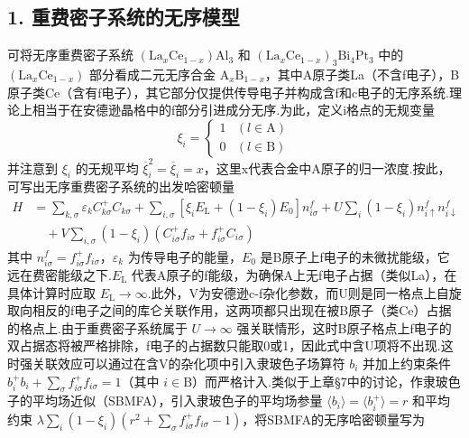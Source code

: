 \subsection*{1. 重费密子系统的无序模型}

可将无序重费密子系统 $\left(\mathrm{La}_{x}\mathrm{Ce}_{1-x}\right)\mathrm{Al}_{3}$ 和 $\left(\mathrm{La}_{x}\mathrm{Ce}_{1-x}\right)_{3}\mathrm{Bi}_{4}\mathrm{Pt}_{3}$ 中的 $\left(\mathrm{La}_{x}\mathrm{Ce}_{1-x}\right)$ 部分看成二元无序合金 $\mathrm{A}_{x}\mathrm{B}_{1-x}$，其中A原子类La（不含f电子），B原子类Ce（含有f电子），其它部分仅提供传导电子并构成含f和c电子的无序系统.理论上相当于在安德逊晶格中的f部分引进成分无序.为此，定义i格点的无规变量
\begin{equation}
  \xi_{i}=\begin{cases}1 & \left(l\in\mathrm{A}\right)\\ 0 & \left(l\in\mathrm{B}\right)\end{cases}
\end{equation}
并注意到 $\xi_{i}$ 的无规平均 $\overline{\xi}_{i}^{2}=\overline{\xi}_{i}=x$，这里x代表合金中A原子的归一浓度.按此，可写出无序重费密子系统的出发哈密顿量
\begin{equation}
\begin{aligned}
  H&=\sum_{k,\sigma}\varepsilon_{k}C_{k\sigma}^{+}C_{k\sigma}
  +\sum_{i,\sigma}\left[\xi_{i}E_{\mathrm{L}}+\left(1-\xi_{i}\right)E_{0}\right]n_{i\sigma}^{f}
  +U\sum_{i}\left(1-\xi_{i}\right)n_{i\uparrow}^{f}n_{i\downarrow}^{f}\\
  &\quad+V\sum_{i,\sigma}\left(1-\xi_{i}\right)
  \left(C_{i\sigma}^{+}f_{i\sigma}+f_{i\sigma}^{+}C_{i\sigma}\right)
\end{aligned}
\end{equation}
其中 $n_{i\sigma}^{f}=f_{i\sigma}^{+}f_{i\sigma}$，$\varepsilon_{k}$ 为传导电子的能量，$E_{0}$ 是B原子上f电子的未微扰能级，它远在费密能级之下.$E_{\mathrm{L}}$ 代表A原子的f能级，为确保A上无f电子占据（类似La），在具体计算时应取 $E_{\mathrm{L}}\rightarrow\infty$.此外，V为安德逊c-f杂化参数，而U则是同一格点上自旋取向相反的f电子之间的库仑关联作用，这两项都只出现在被B原子（类Ce）占据的格点上.由于重费密子系统属于 $U\rightarrow\infty$ 强关联情形，这时B原子格点上f电子的双占据态将被严格排除，f电子的占据数只能取0或1，因此式中含U项将不出现.这时强关联效应可以通过在含V的杂化项中引入隶玻色子场算符 $b_{i}$ 并加上约束条件 $b_{i}^{+}b_{i}+\sum_{\sigma}f_{i\sigma}^{+}f_{i\sigma}=1$（其中 $i\in\mathrm{B}$）而严格计入.类似于上章§7中的讨论，作隶玻色子的平均场近似（SBMFA），引入隶玻色子的平均场参量 $\langle b_{i}\rangle=\langle b_{i}^{+}\rangle=r$ 和平均约束 $\lambda\sum_{i}\left(1-\xi_{i}\right)\left(r^{2}+\sum_{\sigma}f_{i\sigma}^{+}f_{i\sigma}-1\right)$，将SBMFA的无序哈密顿量写为

